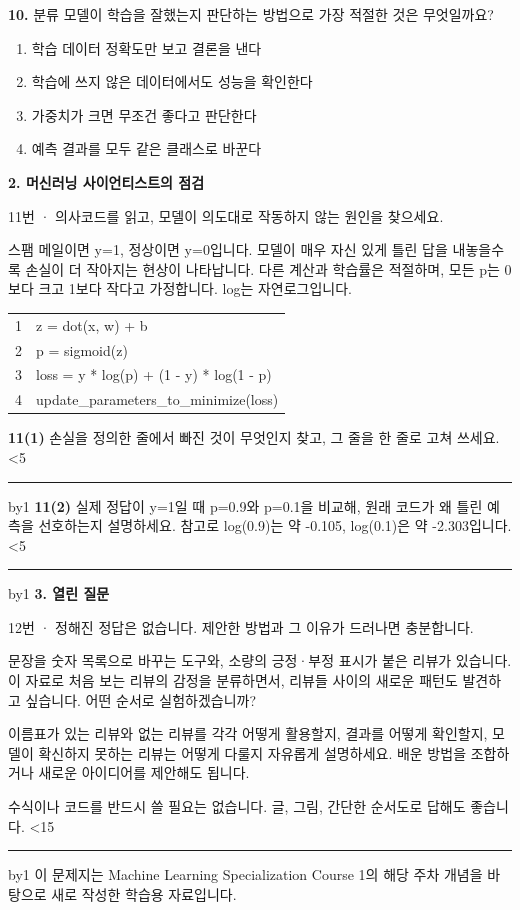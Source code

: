 \documentclass[11pt,a4paper]{article}
\newcommand{\parttitle}[2]{{\large\bfseries\color{ink} #1}\par{\small #2}\par\vspace{5mm}}
\newcommand{\question}[2]{\textbf{#1.} #2\par}
\newcommand{\answerlines}[1]{\foreachline{#1}}
\newcommand{\foreachline}[1]{\linecount=0\loop\ifnum\linecount<#1\vspace{8mm}\par{\color{rulegray}\hrule}\advance\linecount by1\repeat}
\begin{document}
\question{10}{분류 모델이 학습을 잘했는지 판단하는 방법으로 가장 적절한 것은 무엇일까요?}
\begin{enumerate}[label=(\arabic*),leftmargin=9mm,itemsep=0pt,topsep=2pt,parsep=0pt]
\item 학습 데이터 정확도만 보고 결론을 낸다
\item 학습에 쓰지 않은 데이터에서도 성능을 확인한다
\item 가중치가 크면 무조건 좋다고 판단한다
\item 예측 결과를 모두 같은 클래스로 바꾼다
\end{enumerate}\vfill
\newpage
\parttitle{2. 머신러닝 사이언티스트의 점검}{11번 · 의사코드를 읽고, 모델이 의도대로 작동하지 않는 원인을 찾으세요.}
스팸 메일이면 y=1, 정상이면 y=0입니다. 모델이 매우 자신 있게 틀린 답을 내놓을수록 손실이 더 작아지는 현상이 나타납니다. 다른 계산과 학습률은 적절하며, 모든 p는 0보다 크고 1보다 작다고 가정합니다. log는 자연로그입니다.
\par\vspace{3mm}
{\small\ttfamily\begin{tabular}{r l}
1 & \hspace*{0.0mm}z = dot(x, w) + b \\
2 & \hspace*{0.0mm}p = sigmoid(z) \\
3 & \hspace*{0.0mm}loss = y * log(p) + (1 - y) * log(1 - p) \\
4 & \hspace*{0.0mm}update\_parameters\_to\_minimize(loss) \\
\end{tabular}}\par\vspace{5mm}
\textbf{11(1)} 손실을 정의한 줄에서 빠진 것이 무엇인지 찾고, 그 줄을 한 줄로 고쳐 쓰세요.
\answerlines{5}
\vspace{6mm}
\textbf{11(2)} 실제 정답이 y=1일 때 p=0.9와 p=0.1을 비교해, 원래 코드가 왜 틀린 예측을 선호하는지 설명하세요. 참고로 log(0.9)는 약 -0.105, log(0.1)은 약 -2.303입니다.
\answerlines{5}
\vspace{6mm}
\newpage
\parttitle{3. 열린 질문}{12번 · 정해진 정답은 없습니다. 제안한 방법과 그 이유가 드러나면 충분합니다.}
문장을 숫자 목록으로 바꾸는 도구와, 소량의 긍정·부정 표시가 붙은 리뷰가 있습니다. 이 자료로 처음 보는 리뷰의 감정을 분류하면서, 리뷰들 사이의 새로운 패턴도 발견하고 싶습니다. 어떤 순서로 실험하겠습니까?
\par\vspace{3mm}
이름표가 있는 리뷰와 없는 리뷰를 각각 어떻게 활용할지, 결과를 어떻게 확인할지, 모델이 확신하지 못하는 리뷰는 어떻게 다룰지 자유롭게 설명하세요. 배운 방법을 조합하거나 새로운 아이디어를 제안해도 됩니다.
\par\vspace{3mm}
{\small 수식이나 코드를 반드시 쓸 필요는 없습니다. 글, 그림, 간단한 순서도로 답해도 좋습니다.}
\answerlines{15}
\vfill{\footnotesize 이 문제지는 Machine Learning Specialization Course 1의 해당 주차 개념을 바탕으로 새로 작성한 학습용 자료입니다.}
\end{document}
